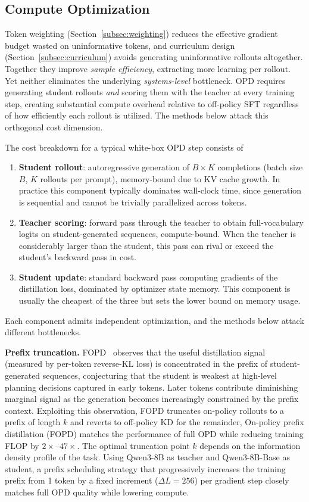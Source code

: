 \documentclass{article} %
\begin{document}
\subsection{Compute Optimization}
\label{subsec:compute}

Token weighting (Section~\ref{subsec:weighting}) reduces the effective gradient budget wasted on uninformative tokens, and curriculum design (Section~\ref{subsec:curriculum}) avoids generating uninformative rollouts altogether. Together they improve \emph{sample efficiency}, extracting more learning per rollout. Yet neither eliminates the underlying \emph{systems-level} bottleneck. OPD requires generating student rollouts \emph{and} scoring them with the teacher at every training step, creating substantial compute overhead relative to off-policy SFT regardless of how efficiently each rollout is utilized. The methods below attack this orthogonal cost dimension.

The cost breakdown for a typical white-box OPD step consists of
\begin{enumerate}[nosep]
    \item \textbf{Student rollout}: autoregressive generation of $B \times K$ completions (batch size $B$, $K$ rollouts per prompt), memory-bound due to KV cache growth. In practice this component typically dominates wall-clock time, since generation is sequential and cannot be trivially parallelized across tokens.
    \item \textbf{Teacher scoring}: forward pass through the teacher to obtain full-vocabulary logits on student-generated sequences, compute-bound. When the teacher is considerably larger than the student, this pass can rival or exceed the student's backward pass in cost.
    \item \textbf{Student update}: standard backward pass computing gradients of the distillation loss, dominated by optimizer state memory. This component is usually the cheapest of the three but sets the lower bound on memory usage.
\end{enumerate}
Each component admits independent optimization, and the methods below attack different bottlenecks.

\textbf{Prefix truncation.} FOPD~\citep{2602.15260} observes that the useful distillation signal (measured by per-token reverse-KL loss) is concentrated in the prefix of student-generated sequences, conjecturing that the student is weakest at high-level planning decisions captured in early tokens. Later tokens contribute diminishing marginal signal as the generation becomes increasingly constrained by the prefix context. Exploiting this observation, FOPD truncates on-policy rollouts to a prefix of length $k$ and reverts to off-policy KD for the remainder, On-policy prefix distillation (FOPD) matches the performance of full OPD while reducing training FLOP by $2\times$--$47\times$. The optimal truncation point $k$ depends on the information density profile of the task. Using Qwen3-8B as teacher and Qwen3-8B-Base as student, a prefix scheduling strategy that progressively increases the training prefix from 1 token by a fixed increment ($\Delta L = 256$) per gradient step closely matches full OPD quality while lowering compute.
\end{document}
